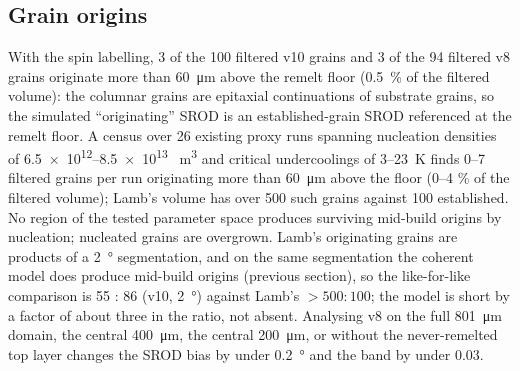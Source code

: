 \documentclass[11pt,a4paper]{article}
\begin{document}
\subsection{Grain origins}
With the spin labelling, 3 of the 100 filtered v10 grains and 3 of the 94 filtered v8 grains originate more than \SI{60}{\micro\metre} above the remelt floor (\SI{0.5}{\percent} of the filtered volume): the columnar grains are epitaxial continuations of substrate grains, so the simulated ``originating'' SROD is an established-grain SROD referenced at the remelt floor. A census over 26 existing proxy runs spanning nucleation densities of \numrange{6.5e12}{8.5e13} \si{\per\cubic\metre} and critical undercoolings of 3--\SI{23}{\kelvin} finds 0--7 filtered grains per run originating more than \SI{60}{\micro\metre} above the floor (0--4 \% of the filtered volume); Lamb's volume has over 500 such grains against 100 established. No region of the tested parameter space produces surviving mid-build origins by nucleation; nucleated grains are overgrown. Lamb's originating grains are products of a \SI{2}{\degree} segmentation, and on the same segmentation the coherent model does produce mid-build origins (previous section), so the like-for-like comparison is 55 : 86 (v10, \SI{2}{\degree}) against Lamb's $> 500 : 100$; the model is short by a factor of about three in the ratio, not absent. Analysing v8 on the full \SI{801}{\micro\metre} domain, the central \SI{400}{\micro\metre}, the central \SI{200}{\micro\metre}, or without the never-remelted top layer changes the SROD bias by under \SI{0.2}{\degree} and the band by under 0.03.
\end{document}
